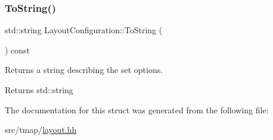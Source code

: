 \subsubsection{\texorpdfstring{To\+String()}{ToString()}}
{\footnotesize\ttfamily std\+::string Layout\+Configuration\+::\+To\+String (\begin{DoxyParamCaption}{ }\end{DoxyParamCaption}) const\hspace{0.3cm}{\ttfamily [inline]}}



Returns a string describing the set options. 

\begin{DoxyReturn}{Returns}
std\+::string 
\end{DoxyReturn}


The documentation for this struct was generated from the following file\+:\begin{DoxyCompactItemize}
\item 
src/tmap/\hyperlink{layout_8hh}{layout.\+hh}\end{DoxyCompactItemize}
